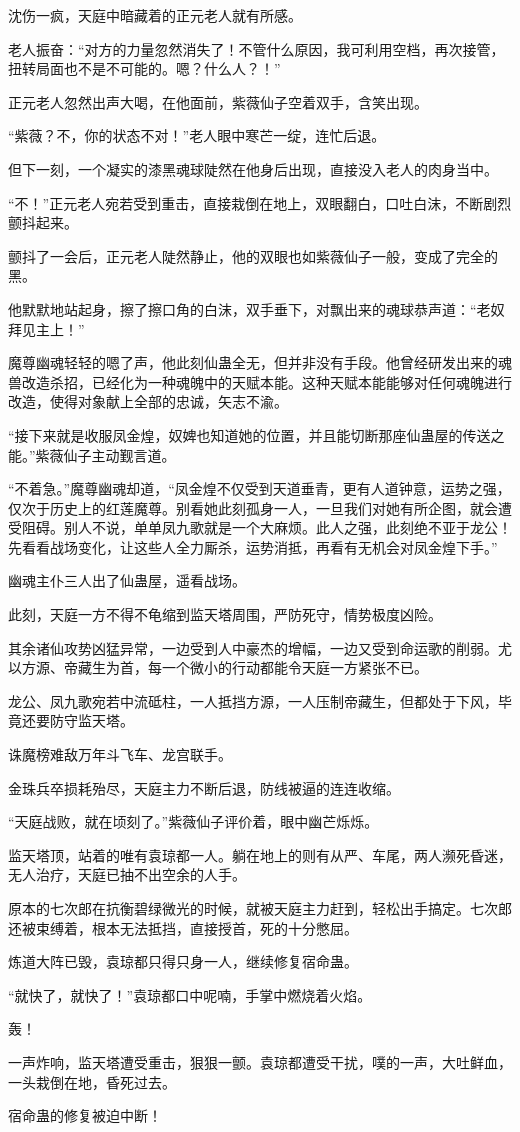 \begin{this_body}
沈伤一疯，天庭中暗藏着的正元老人就有所感。

老人振奋：“对方的力量忽然消失了！不管什么原因，我可利用空档，再次接管，扭转局面也不是不可能的。嗯？什么人？！”

正元老人忽然出声大喝，在他面前，紫薇仙子空着双手，含笑出现。

“紫薇？不，你的状态不对！”老人眼中寒芒一绽，连忙后退。

但下一刻，一个凝实的漆黑魂球陡然在他身后出现，直接没入老人的肉身当中。

“不！”正元老人宛若受到重击，直接栽倒在地上，双眼翻白，口吐白沫，不断剧烈颤抖起来。

颤抖了一会后，正元老人陡然静止，他的双眼也如紫薇仙子一般，变成了完全的黑。

他默默地站起身，擦了擦口角的白沫，双手垂下，对飘出来的魂球恭声道：“老奴拜见主上！”

魔尊幽魂轻轻的嗯了声，他此刻仙蛊全无，但并非没有手段。他曾经研发出来的魂兽改造杀招，已经化为一种魂魄中的天赋本能。这种天赋本能能够对任何魂魄进行改造，使得对象献上全部的忠诚，矢志不渝。

“接下来就是收服凤金煌，奴婢也知道她的位置，并且能切断那座仙蛊屋的传送之能。”紫薇仙子主动觐言道。

“不着急。”魔尊幽魂却道，“凤金煌不仅受到天道垂青，更有人道钟意，运势之强，仅次于历史上的红莲魔尊。别看她此刻孤身一人，一旦我们对她有所企图，就会遭受阻碍。别人不说，单单凤九歌就是一个大麻烦。此人之强，此刻绝不亚于龙公！先看看战场变化，让这些人全力厮杀，运势消抵，再看有无机会对凤金煌下手。”

幽魂主仆三人出了仙蛊屋，遥看战场。

此刻，天庭一方不得不龟缩到监天塔周围，严防死守，情势极度凶险。

其余诸仙攻势凶猛异常，一边受到人中豪杰的增幅，一边又受到命运歌的削弱。尤以方源、帝藏生为首，每一个微小的行动都能令天庭一方紧张不已。

龙公、凤九歌宛若中流砥柱，一人抵挡方源，一人压制帝藏生，但都处于下风，毕竟还要防守监天塔。

诛魔榜难敌万年斗飞车、龙宫联手。

金珠兵卒损耗殆尽，天庭主力不断后退，防线被逼的连连收缩。

“天庭战败，就在顷刻了。”紫薇仙子评价着，眼中幽芒烁烁。

监天塔顶，站着的唯有袁琼都一人。躺在地上的则有从严、车尾，两人濒死昏迷，无人治疗，天庭已抽不出空余的人手。

原本的七次郎在抗衡碧绿微光的时候，就被天庭主力赶到，轻松出手搞定。七次郎还被束缚着，根本无法抵挡，直接授首，死的十分憋屈。

炼道大阵已毁，袁琼都只得只身一人，继续修复宿命蛊。

“就快了，就快了！”袁琼都口中呢喃，手掌中燃烧着火焰。

轰！

一声炸响，监天塔遭受重击，狠狠一颤。袁琼都遭受干扰，噗的一声，大吐鲜血，一头栽倒在地，昏死过去。

宿命蛊的修复被迫中断！

\end{this_body}

